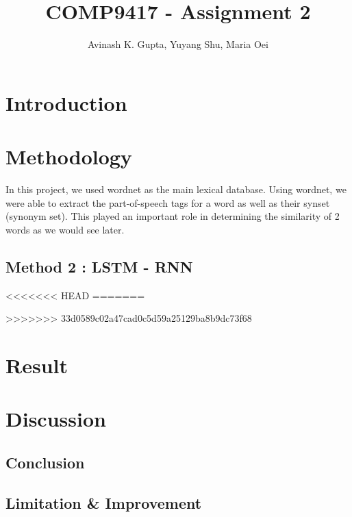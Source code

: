 \documentclass[11pt, oneside]{article}   	%
\title{COMP9417 - Assignment 2}
\author{Avinash K. Gupta, Yuyang Shu, Maria Oei}
\begin{document}
\maketitle

\section{Introduction}



\section{Methodology}
In this project, we used wordnet as the main lexical database. Using wordnet, we were able to extract the part-of-speech tags for a word as well as their synset (synonym set). This played an important role in determining the similarity of 2 words as we would see later.





\pagebreak
\subsection{Method 2 : LSTM - RNN}
%

<<<<<<< HEAD
=======

>>>>>>> 33d0589c02a47cad0c5d59a25129ba8b9dc73f68



\section{Result}
%

\section{Discussion}
\subsection{Conclusion}
 \subsection{Limitation \& Improvement}
\end{document}
